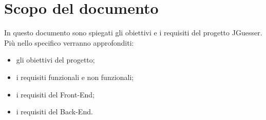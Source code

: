 \section*{Scopo del documento}
In questo documento sono spiegati gli obiettivi e i requisiti del progetto JGuesser. Più nello specifico verranno approfonditi: 
\begin{itemize}
    \item gli obiettivi del progetto;
    \item i requisiti funzionali e non funzionali;
    \item i requisiti del Front-End;
    \item i requisiti del Back-End.
\end{itemize}